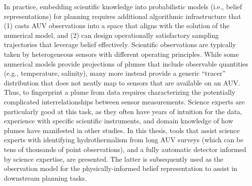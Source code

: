 In practice, embedding scientific knowledge into probabilistic models (i.e., belief representations) for planning requires additional algorithmic infrastructure that (1) casts AUV observations into a space that aligns with the solution of the numerical model, and (2) can design operationally satisfactory sampling trajectories that leverage belief effectively.
Scientific observations are typically taken by heterogeneous sensors with different operating principles.
While some numerical models provide projections of plumes that include observable quantities\autocite{speer1989model} (e.g., temperature, salinity), many more instead provide a generic ``tracer'' distribution that does not neatly map to sensors that are available on an AUV.
Thus, to fingerprint a plume from data requires characterizing the potentially complicated interrelationships between sensor measurements\autocite{jakuba2007stochastic}.
Science experts are particularly good at this task, as they often have years of intuition for the data, experience with specific scientific instruments, and domain knowledge of how plumes have manifested in other studies.
In this thesis, tools that assist science experts with identifying hydrothermalism from long AUV surveys (which can be tens of thousands of point observations), and a fully automatic detector informed by science expertise, are presented.
The latter is subsequently used as the observation model for the physically-informed belief representation to assist in downstream planning tasks.



